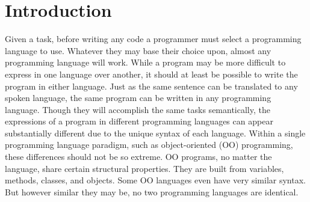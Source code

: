 \documentclass[sigplan,review,anonymous]{acmart}\settopmatter{printfolios=true,printccs=false,printacmref=false}
\begin{document}
\section{Introduction}

Given a task, before writing any code a programmer must select a programming 
language to use. Whatever they may base their choice upon, almost any
programming language will work. While a program may be more difficult to
express in one language over another, it should at least be possible to write
the program in either language. Just as the same sentence can be translated to
any spoken language, the same program can be written in any programming
language. Though they will accomplish the same tasks semantically, the
expressions of a program in different programming languages can appear
substantially different due to the unique syntax of each language. Within a
single programming language paradigm, such as object-oriented (OO) programming,
these differences should not be so extreme. OO programs, no matter the
language, share certain structural properties. They are built from variables,
methods, classes, and objects. Some OO languages even have very similar syntax.
But however similar they may be, no two programming languages are identical.
\end{document}
